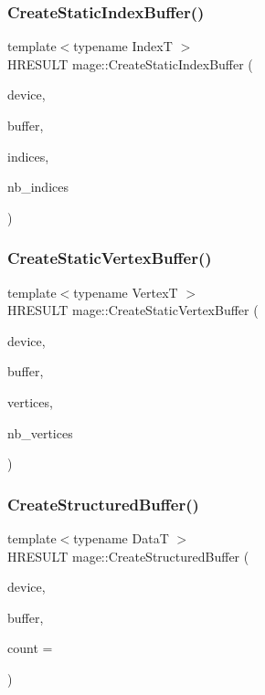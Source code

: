 \subsubsection{\texorpdfstring{Create\+Static\+Index\+Buffer()}{CreateStaticIndexBuffer()}}
{\footnotesize\ttfamily template$<$typename IndexT $>$ \\
H\+R\+E\+S\+U\+LT mage\+::\+Create\+Static\+Index\+Buffer (\begin{DoxyParamCaption}\item[{I\+D3\+D11\+Device2 $\ast$}]{device,  }\item[{I\+D3\+D11\+Buffer $\ast$$\ast$}]{buffer,  }\item[{const IndexT $\ast$}]{indices,  }\item[{size\+\_\+t}]{nb\+\_\+indices }\end{DoxyParamCaption})}

\hypertarget{namespacemage_a7cf0754e3bc2681bc1990e64f4155032}{}\label{namespacemage_a7cf0754e3bc2681bc1990e64f4155032} 
\subsubsection{\texorpdfstring{Create\+Static\+Vertex\+Buffer()}{CreateStaticVertexBuffer()}}
{\footnotesize\ttfamily template$<$typename VertexT $>$ \\
H\+R\+E\+S\+U\+LT mage\+::\+Create\+Static\+Vertex\+Buffer (\begin{DoxyParamCaption}\item[{I\+D3\+D11\+Device2 $\ast$}]{device,  }\item[{I\+D3\+D11\+Buffer $\ast$$\ast$}]{buffer,  }\item[{const VertexT $\ast$}]{vertices,  }\item[{size\+\_\+t}]{nb\+\_\+vertices }\end{DoxyParamCaption})}

\hypertarget{namespacemage_a9090692dded3dfa6abbcb2023b1e6327}{}\label{namespacemage_a9090692dded3dfa6abbcb2023b1e6327} 
\subsubsection{\texorpdfstring{Create\+Structured\+Buffer()}{CreateStructuredBuffer()}}
{\footnotesize\ttfamily template$<$typename DataT $>$ \\
H\+R\+E\+S\+U\+LT mage\+::\+Create\+Structured\+Buffer (\begin{DoxyParamCaption}\item[{I\+D3\+D11\+Device2 $\ast$}]{device,  }\item[{I\+D3\+D11\+Buffer $\ast$$\ast$}]{buffer,  }\item[{size\+\_\+t}]{count = {} }\end{DoxyParamCaption})}

